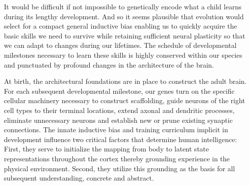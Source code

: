 \documentclass[letterpaper,11pt]{article}
\begin{document}
It would be difficult if not impossible to genetically encode what a child learns during its lengthy development. And so it seems plausible that evolution would select for a compact general inductive bias enabling us to quickly acquire the basic skills we need to survive while retaining sufficient neural plasticity so that we can adapt to changes during our lifetimes. The schedule of developmental milestones necessary to learn these skills is highly conserved within our species and punctuated by profound changes in the architecture of the brain.

At birth, the architectural foundations are in place to construct the adult brain. For each subsequent developmental milestone, our genes turn on the specific cellular machinery necessary to construct scaffolding, guide neurons of the right cell types to their terminal locations, extend axonal and dendritic processes, eliminate unnecessary neurons and establish new or prune existing synaptic connections. The innate inductive bias and training curriculum implicit in development influence two critical factors that determine human intelligence: First, they serve to initialize the mapping from body to latent state representations throughout the cortex thereby grounding experience in the physical environment. Second, they utilize this grounding as the basis for all subsequent understanding, concrete and abstract. 
\end{document}
